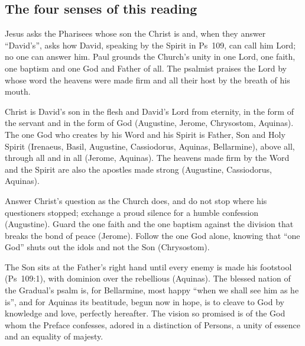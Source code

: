 \subsection{The four senses of this reading}

\begin{fourSenses}
\item[Literal.] Jesus asks the Pharisees whose son the Christ is and, when
they answer ``David's'', asks how David, speaking by the Spirit in Ps~109, can
call him Lord; no one can answer him. Paul grounds the Church's unity in one
Lord, one faith, one baptism and one God and Father of all. The psalmist praises
the Lord by whose word the heavens were made firm and all their host by the
breath of his mouth.

\item[Allegorical.] Christ is David's son in the flesh and David's Lord from
eternity, in the form of the servant and in the form of God (Augustine,
Jerome, Chrysostom, Aquinas). The one God who creates by his Word and his
Spirit is Father, Son and Holy Spirit (Irenaeus, Basil, Augustine,
Cassiodorus, Aquinas, Bellarmine), above all, through all and in all (Jerome,
Aquinas). The heavens made firm by the Word and the Spirit are also the
apostles made strong (Augustine, Cassiodorus, Aquinas).

\item[Moral.] Answer Christ's question as the Church does, and do not stop
where his questioners stopped; exchange a proud silence for a humble
confession (Augustine). Guard the one faith and the one baptism against the
division that breaks the bond of peace (Jerome). Follow the one God alone,
knowing that ``one God'' shuts out the idols and not the Son (Chrysostom).

\item[Anagogical.] The Son sits at the Father's right hand until every enemy
is made his footstool (Ps~109:1), with dominion over the rebellious (Aquinas).
The blessed nation of the Gradual's psalm is, for Bellarmine, most happy
``when we shall see him as he is'', and for Aquinas its beatitude, begun now in
hope, is to cleave to God by knowledge and love, perfectly hereafter. The
vision so promised is of the God whom the Preface confesses, adored in a
distinction of Persons, a unity of essence and an equality of majesty.
\end{fourSenses}
